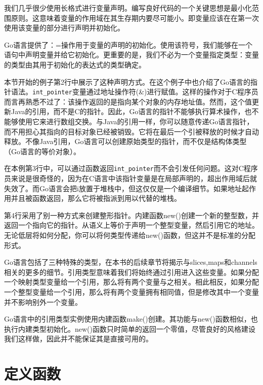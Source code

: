 我们几乎很少使用长格式进行变量声明。编写良好代码的一个关键思想是最小化范围原则。这意味着变量的作用域在其生存期内要尽可能小。即变量应该在在第一次使用该变量的部分进行声明并初始化。

Go语言提供了：=操作用于变量的声明的初始化。使用该符号，我们能够在一个语句中声明变量并给它初始化。更重要的是，我们不必为一个变量指定类型：变量的类型由其用于初始化的表达式的类型确定。

本节开始的例子第2行中展示了这种声明方式。在这个例子中也介绍了Go语言的指针语法。\lstinline$int_pointer$变量通过地址操作符(\&)进行赋值。这样的操作对于C程序员而言再熟悉不过了：该操作返回的是指向某个对象的内存地址值。然而，这个值更新Java的引用，而不是C的指针。因此，Go语言的指针不能够执行算术操作，也不能够使用它来进行数组交换。与Java的引用一样，你可以随意传递Go语言指针，而不用担心其指向的目标对象已经被销毁。它将在最后一个引被释放的时候才自动释放。不像Java引用，Go语言可以创建原始类型的指针，而不仅是结构体类型（Go语言的等价对象）。

在本例第3行中，可以通过函数返回\lstinline$int_pointer$而不会引发任何问题。这对C程序员来说是很奇怪的，因为在C语言中该指针变量是在局部声明的，超出作用域后就失效了。而Go语言会把i放置于堆栈中，但这仅仅是一个编译细节。如果地址起作用并且被函数返回，那么它将被指派到用以代替的堆栈。

第4行采用了别一种方式来创建整形指针。内建函数new()创建一个新的整型数，并返回一个指向它的指针。从语义上等价于声明一个整型变量，然后引用它的地址。无论低层将如何分配，你可以将何类型传递给new()函数，但这并不是标准的分配形式。

Go语言包括了三种特殊的类型，在本书的后续章节将揭示与slices,maps和channels相关的更多的细节。引用类型意味着我们将始终通过引用进入这些变量。如果分配一个映射类型变量给一个引用，那么将有两个变量与之相关。相此相反，如果分配一个整型变量给一个引用，那么将有两个变量拥有相同值，但是修改其中一个变量并不影响别外一个变量。

Go语言中的引用类型实例使用内建函数make()创建。其功能与new()函数相似，也执行内建类型初始化。new()函数只时简单的返回一个零值，尽管良好的风格建设我们这样做，因此并不能保证其是直接可用的。

\section{定义函数}
\endinput